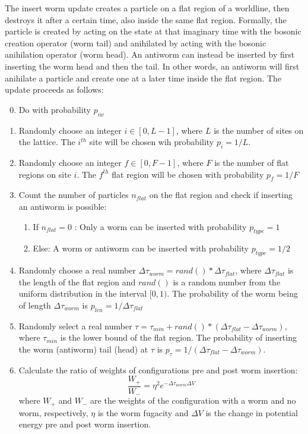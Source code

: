 \documentclass[12pt, two sided]{article}
\begin{document}
    The insert worm update creates a particle on a flat region of a worldline, then destroys it after a certain time, also inside the same flat region. Formally, the particle is created by acting on the state at that imaginary time with the bosonic creation operator (worm tail) and anihilated by acting with the bosonic anihilation operator (worm head). An antiworm can instead be inserted by first inserting the worm head and then the tail. In other words, an antiworm will first anihilate a particle and create one at a later time inside the flat region. The update proceeds as follows:
%
    \begin{enumerate}
        \setcounter{enumi}{-1}
    \item Do with probability $p_{iw}$
        \item Randomly choose an integer $i \in [0,L-1]$, where $L$ is the number of sites on the lattice. The $i^{th}$ site will be chosen wih probability $p_i = 1/L$.
        \item Randomly choose an integer $f \in [0,F - 1]$, where $F$ is the number of flat regions on site $i$. The $f^{th}$ flat region will be chosen with probability $p_{f} = 1/F$
        \item Count the number of particles $n_{flat}$ on the flat region and check if inserting an antiworm is possible:
            \begin{enumerate}
            \item If $n_{flat} = 0$ : Only a worm can be inserted with probability $p_{type} = 1$
            \item Else: A worm or antiworm can be inserted with probability $p_{type} = 1/2$
            \end{enumerate}
        \item Randomly choose a real number $\Delta\tau_{worm} = rand()*\Delta\tau_{flat}$, where $\Delta\tau_{flat}$ is the length of the flat region and $rand()$ is a random number from the uniform distribution in the interval $[0,1)$. The probability of the worm being of length $\Delta\tau_{worm}$ is $p_{len} = 1/{\Delta\tau_{flat}}$
        \item Randomly select a real number $\tau = \tau_{min} + rand()*(\Delta\tau_{flat}-\Delta\tau_{worm})$, where $\tau_{min}$ is the lower bound of the flat region. The probability of inserting the worm (antiworm) tail (head) at $\tau$ is $p_{\tau} = 1/(\Delta\tau_{flat} - \Delta\tau_{worm})$.
        \item Calculate the ratio of weights of configurations pre and post worm insertion:
            \begin{equation}
            \frac{W_+}{W_-} = \eta^2 e^{-\Delta\tau_{worm} \Delta V}
            \label{eq:insert_ratios}
            \end{equation}
            where $W_+$ and $W_-$ are the weights of the configuration with a worm and no worm, respectively, $\eta$ is the worm fugacity and $\Delta V$ is the change in potential energy pre and post worm insertion. 
    \end{enumerate}
\end{document}

